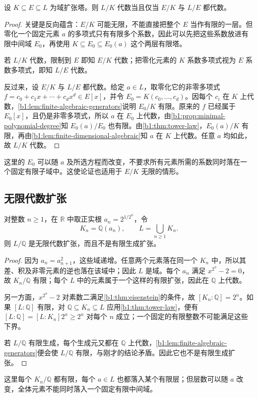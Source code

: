 \begin{theorem}\label{b1:thm:algebraic-tower}
	设 \(K\subseteq E\subseteq L\) 为域扩张塔。则 \(L/K\) 代数当且仅当 \(E/K\) 与 \(L/E\) 都代数。
\end{theorem}
\begin{proof}
	关键是反向蕴含：\(E/K\) 可能无限，不能直接把整个 \(E\) 当作有限的一层。但零化一个固定元素 \(a\) 的多项式只有有限多个系数，因此可以先把这些系数放进有限中间域 \(E_0\)，再使用 \(K\subseteq E_0\subseteq E_0(a)\) 这个两层有限塔。

	若 \(L/K\) 代数，限制到 \(E\) 即知 \(E/K\) 代数；把零化元素的 \(K\) 系数多项式视为 \(E\) 系数多项式，即知 \(L/E\) 代数。

	反过来，设 \(E/K\) 与 \(L/E\) 都代数。给定 \(a\in L\)，取零化它的非零多项式 \(f=c_0+c_1x+\cdots+c_dx^d\in E[x]\)，并令 \(E_0=K(c_0,\ldots,c_d)\)。因每个 \(c_i\) 在 \(K\) 上代数，\cref{b1:lem:finite-algebraic-generators}说明 \(E_0/K\) 有限。原来的 \(f\) 已经属于 \(E_0[x]\)，且仍是非零多项式，所以 \(a\) 在 \(E_0\) 上代数，由\cref{b1:prop:minimal-polynomial-degree}知 \(E_0(a)/E_0\) 也有限。由\cref{b1:thm:tower-law}，\(E_0(a)/K\) 有限，再由\cref{b1:lem:finite-dimensional-algebraic}知 \(a\) 在 \(K\) 上代数。任意 \(a\) 均如此，故 \(L/K\) 代数。
\end{proof}
这里的 \(E_0\) 可以随 \(a\) 及所选方程而改变，不要求所有元素所需的系数同时落在一个固定有限子域中。这使论证也适用于 \(E/K\) 无限的情形。

\subsection{无限代数扩张}
\label{b1:subsec:1402:03}

\begin{proposition}\label{b1:prop:infinite-algebraic-root-tower}
	对整数 \(n\geq1\)，在 \(\mathbb R\) 中取正实根 \(a_n=2^{1/2^n}\)，令
	\[
		K_n=\mathbb Q(a_n),\qquad L=\bigcup_{n\geq1}K_n.
	\]
	则 \(L/\mathbb Q\) 是无限代数扩张，而且不是有限生成扩张。
\end{proposition}
\begin{proof}
	因为 \(a_n=a_{n+1}^2\)，这些域递增。任意两个元素落在同一个 \(K_n\) 中，所以其差、积及非零元素的逆也落在该域中；因此 \(L\) 是域。每个 \(a_n\) 满足 \(x^{2^n}-2=0\)，故 \(K_n/\mathbb Q\) 有限；每个 \(L\) 中的元素属于一个这样的有限扩张，因此在 \(\mathbb Q\) 上代数。

	另一方面，\(x^{2^n}-2\) 对素数二满足\cref{b1:thm:eisenstein}的条件，故 \([K_n:\mathbb Q]=2^n\)。如果 \([L:\mathbb Q]\) 有限，对 \(\mathbb Q\subseteq K_n\subseteq L\) 应用\cref{b1:thm:tower-law}，便有 \([L:\mathbb Q]=[L:K_n]2^n\geq2^n\) 对每个 \(n\) 成立；一个固定的有限整数不可能满足这些下界。

	若 \(L/\mathbb Q\) 有限生成，每个生成元又都在 \(\mathbb Q\) 上代数，\cref{b1:lem:finite-algebraic-generators}便会使 \(L/\mathbb Q\) 有限，与刚才的结论矛盾。因此它也不是有限生成扩张。
\end{proof}
这里每个 \(K_n/\mathbb Q\) 都有限，每个 \(a\in L\) 也都落入某个有限层；但层数可以随 \(a\) 改变，全体元素不能同时落入一个固定有限中间域。

